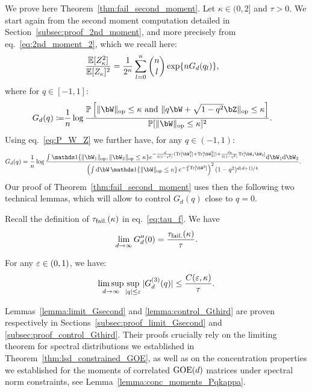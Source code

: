 We prove here Theorem~\ref{thm:fail_second_moment}.
Let $\kappa \in (0, 2]$ and $\tau > 0$. We start again from the second moment computation detailed in Section~\ref{subsec:proof_2nd_moment}, 
and more precisely from eq.~\eqref{eq:2nd_moment_2}, which we recall here:
\begin{align}\label{eq:2nd_moment_recall}
    \frac{\mathbb{E}[Z_\kappa^2]}{\mathbb{E}[Z_\kappa]^2} &= \frac{1}{2^n} \sum_{l=0}^n \binom{n}{l} \exp\{n G_d(q_l)\}, 
\end{align}
where for $q \in [-1,1]$:
\begin{align*}
    G_d(q) \coloneqq&  
    \frac{1}{n} \log \frac{\bbP\left[\|\bW\|_\op \leq \kappa \textrm{ and } \|q \bW + \sqrt{1-q^2} \bZ\|_\op \leq \kappa\right]}{\bbP[\|\bW\|_\op \leq \kappa]^2}.
\end{align*}
Using eq.~\eqref{eq:P_W_Z} we further have, for any $q \in (-1,1)$:
\begin{align}\label{eq:Gd_integral}
    G_d(q) &= \frac{1}{n} \log \frac{\int \indi\{\|\bW_1\|_\op, \|\bW_2\|_\op \leq \kappa\} e^{-\frac{d}{4(1-q^2)} (\Tr[\bW_1^2] + \Tr[\bW_2^2]) + \frac{dq}{2(1-q^2)} \Tr[\bW_1 \bW_2]} \rd \bW_1 \rd \bW_2}{\left(\int \rd \bW \, \indi\{\|\bW \|_\op \leq \kappa\} \, e^{-\frac{d}{4}\Tr[\bW^2]}\right)^2 (1-q^2)^{d(d+1)/4}}.
\end{align}
Our proof of Theorem~\ref{thm:fail_second_moment} uses then the following two technical lemmas, which will allow to control 
$G_d(q)$ close to $q = 0$.
\begin{lemma}\label{lemma:limit_Gsecond}
    Recall the definition of $\tau_{\rm fail.}(\kappa)$ in eq.~\eqref{eq:tau_f}. We have
    \begin{equation*}
        \lim_{d \to \infty} G_d''(0) = \frac{\tau_{\rm fail.}(\kappa)}{\tau}.
    \end{equation*}
\end{lemma}
\begin{lemma}\label{lemma:control_Gthird}
    For any $\varepsilon \in (0,1)$, we have:
    \begin{equation*}
        \limsup_{d \to \infty} \sup_{|q| \leq \varepsilon} |G_d^{(3)}(q)| \leq \frac{C(\varepsilon, \kappa)}{\tau}.
    \end{equation*}
\end{lemma}
\noindent
Lemmas~\ref{lemma:limit_Gsecond} and \ref{lemma:control_Gthird} are proven respectively in Sections~\ref{subsec:proof_limit_Gsecond} and \ref{subsec:proof_control_Gthird}.
Their proofs crucially rely on the limiting theorem for spectral distributions we established in Theorem~\ref{thm:lsd_constrained_GOE}, as well as on 
the concentration properties we established for the moments of correlated $\mathrm{GOE}(d)$ matrices under spectral norm constraints, see Lemma~\ref{lemma:conc_moments_Pqkappa}.

